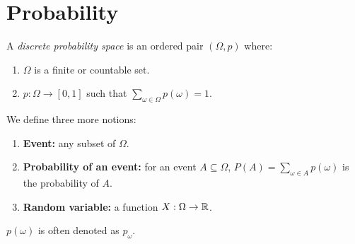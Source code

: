 \section{Probability} \label{sec:prob}
\begin{definition} \label{def:prob:discrete_space}
    A \emph{discrete probability space} is an ordered pair $(\Omega, p)$ where:
    \begin{enumerate}
        \item $\Omega$ is a finite or countable set.
        \item $p : \Omega \to [0, 1]$ such that $\sum_{\omega \in \Omega} p(\omega) = 1.$
    \end{enumerate}
    We define three more notions:
    \begin{enumerate}
        \item \textbf{Event:} any subset of $\Omega$.
        \item \textbf{Probability of an event:} for an event
            $A \subseteq \Omega$, $P(A) = \sum_{\omega \in A} p(\omega)$
            is the probability of $A$.
        \item \textbf{Random variable:} a function $X : \Omega \to \mathbb{R}$.
    \end{enumerate}
\end{definition}
\begin{notation}
    $p(\omega)$ is often denoted as $p_{\omega}$.
\end{notation}
